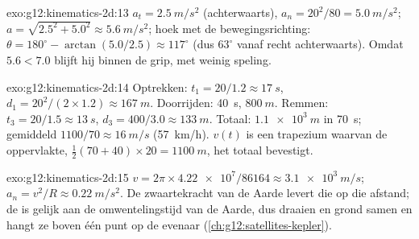 \begin{solution}{exo:g12:kinematics-2d:13}
$a_t = \qty{2.5}{m/s^2}$ (achterwaarts), $a_n = 20^2/80 =
\qty{5.0}{m/s^2}$; $a = \sqrt{2.5^2 + 5.0^2} \approx \qty{5.6}{m/s^2}$;
hoek met de bewegingsrichting:
$\theta = 180^\circ - \arctan(5.0/2.5) \approx 117^\circ$ (dus
$63^\circ$ vanaf recht achterwaarts). Omdat $5.6 < 7.0$ blijft hij binnen
de grip, met weinig speling.
\end{solution}

\begin{solution}{exo:g12:kinematics-2d:14}
Optrekken: $t_1 = 20/1.2 \approx \qty{17}{s}$,
$d_1 = 20^2/(2 \times 1.2) \approx \qty{167}{m}$. Doorrijden:
\qty{40}{s}, $\qty{800}{m}$. Remmen: $t_3 = 20/1.5 \approx \qty{13}{s}$,
$d_3 = 400/3.0 \approx \qty{133}{m}$. Totaal: $\qty{1.1e3}{m}$ in
\qty{70}{s}; gemiddeld $1100/70 \approx \qty{16}{m/s}$
(\qty{57}{km/h}). $v(t)$ is een trapezium waarvan de oppervlakte,
$\tfrac12(70 + 40) \times 20 = \qty{1100}{m}$, het totaal bevestigt.
\end{solution}

\begin{solution}{exo:g12:kinematics-2d:15}
$v = 2\pi \times \num{4.22e7}/\num{86164} \approx \qty{3.1e3}{m/s}$;
$a_n = v^2/R \approx \qty{0.22}{m/s^2}$. De zwaartekracht van de Aarde
levert die op die afstand; de  is gelijk aan de omwentelingstijd
van de Aarde, dus draaien  en grond samen en hangt ze boven één
punt op de evenaar (\cref{ch:g12:satellites-kepler}).
\end{solution}

